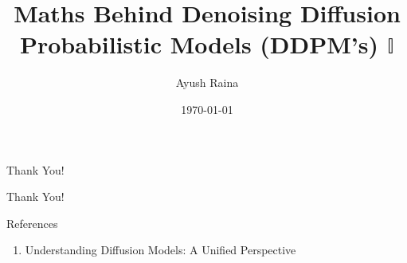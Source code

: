 \documentclass{beamer}
\author{Ayush Raina}
\title{Maths Behind Denoising Diffusion Probabilistic Models (DDPM's) $\mathbb{I}$}
\institute{
    Indian Institute of Science \\
}
\date{\today}
\begin{document}
\begin{frame}
    \titlepage
\end{frame}
    





\begin{frame}{Thank You!}
    \begin{center}
        \Huge Thank You!
    \end{center}
\end{frame}

\begin{frame}{References}
    \begin{enumerate}
        \item Understanding Diffusion Models: A Unified Perspective
    \end{enumerate}
\end{frame}
\end{document}
